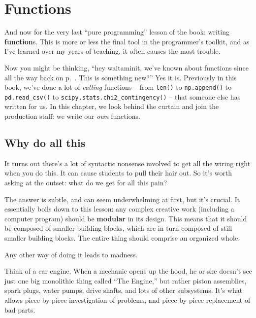 
\chapter{Functions}
\label{ch:functions}


And now for the very last ``pure programming'' lesson of the book: writing
\textbf{function}s. This is more or less the final tool in the programmer's
toolkit, and as I've learned over my years of teaching, it often causes the
most trouble.

Now you might be thinking, ``hey waitaminit, we've known about functions since
all the way back on p.~\pageref{function}. This is something new?'' Yes it is.
Previously in this book, we've done a lot of \textit{calling} functions -- from
\texttt{len()} to \texttt{np.append()} to \texttt{pd.read\_csv()} to
\texttt{scipy.stats.chi2\_contingency()} -- that someone else has written for
us. In this chapter, we look behind the curtain and join the production staff:
we write our \textit{own} functions.

\section{Why do all this}

It turns out there's a lot of syntactic nonsense involved to get all the wiring
right when you do this. It can cause students to pull their hair out. So it's
worth asking at the outset: what do we get for all this pain?


The answer is subtle, and can seem underwhelming at first, but it's crucial. It
essentially boils down to this lesson: any complex creative work (including a
computer program) should be \textbf{modular} in its design. This means that it
should be composed of smaller building blocks, which are in turn composed of
still smaller building blocks. The entire thing should comprise an organized
whole.

Any other way of doing it leads to madness.


Think of a car engine. When a mechanic opens up the hood, he or she doesn't see
just one big monolithic thing called ``The Engine,'' but rather piston
assemblies, spark plugs, water pumps, drive shafts, and lots of other
subsystems. It's what allows piece by piece investigation of problems, and
piece by piece replacement of bad parts.

